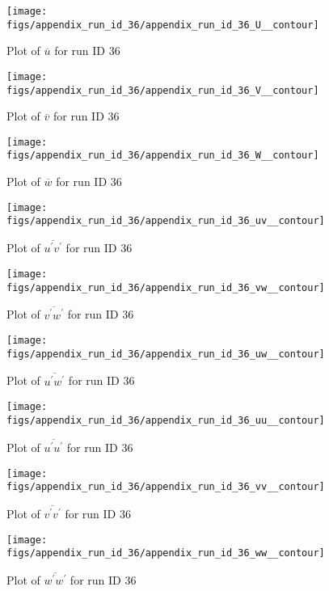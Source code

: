 \begin{figure}[H]
\centering
\texttt{[image: figs/appendix\_run\_id\_36/appendix\_run\_id\_36\_U\_\_contour]}
\caption{Plot of $\overline{u}$ for run ID 36}
\label{fig:appendix_run_id_36_U__contour}
\end{figure}


\begin{figure}[H]
\centering
\texttt{[image: figs/appendix\_run\_id\_36/appendix\_run\_id\_36\_V\_\_contour]}
\caption{Plot of $\overline{v}$ for run ID 36}
\label{fig:appendix_run_id_36_V__contour}
\end{figure}


\begin{figure}[H]
\centering
\texttt{[image: figs/appendix\_run\_id\_36/appendix\_run\_id\_36\_W\_\_contour]}
\caption{Plot of $\overline{w}$ for run ID 36}
\label{fig:appendix_run_id_36_W__contour}
\end{figure}


\begin{figure}[H]
\centering
\texttt{[image: figs/appendix\_run\_id\_36/appendix\_run\_id\_36\_uv\_\_contour]}
\caption{Plot of $\overline{u^\prime v^\prime}$ for run ID 36}
\label{fig:appendix_run_id_36_uv__contour}
\end{figure}


\begin{figure}[H]
\centering
\texttt{[image: figs/appendix\_run\_id\_36/appendix\_run\_id\_36\_vw\_\_contour]}
\caption{Plot of $\overline{v^\prime w^\prime}$ for run ID 36}
\label{fig:appendix_run_id_36_vw__contour}
\end{figure}


\begin{figure}[H]
\centering
\texttt{[image: figs/appendix\_run\_id\_36/appendix\_run\_id\_36\_uw\_\_contour]}
\caption{Plot of $\overline{u^\prime w^\prime}$ for run ID 36}
\label{fig:appendix_run_id_36_uw__contour}
\end{figure}


\begin{figure}[H]
\centering
\texttt{[image: figs/appendix\_run\_id\_36/appendix\_run\_id\_36\_uu\_\_contour]}
\caption{Plot of $\overline{u^\prime u^\prime}$ for run ID 36}
\label{fig:appendix_run_id_36_uu__contour}
\end{figure}


\begin{figure}[H]
\centering
\texttt{[image: figs/appendix\_run\_id\_36/appendix\_run\_id\_36\_vv\_\_contour]}
\caption{Plot of $\overline{v^\prime v^\prime}$ for run ID 36}
\label{fig:appendix_run_id_36_vv__contour}
\end{figure}


\begin{figure}[H]
\centering
\texttt{[image: figs/appendix\_run\_id\_36/appendix\_run\_id\_36\_ww\_\_contour]}
\caption{Plot of $\overline{w^\prime w^\prime}$ for run ID 36}
\label{fig:appendix_run_id_36_ww__contour}
\end{figure}


